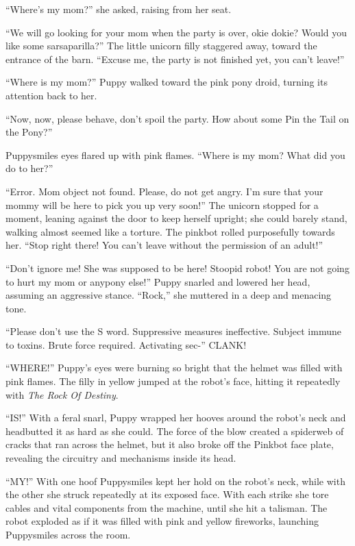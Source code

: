 ``Where's my mom?'' she asked, raising from her seat.

``We will go looking for your mom when the party is over, okie dokie? Would you like some sarsaparilla?'' The little unicorn filly staggered away, toward the entrance of the barn. ``Excuse me, the party is not finished yet, you can't leave!''

``Where is my mom?'' Puppy walked toward the pink pony droid, turning its attention back to her.

``Now, now, please behave, don't spoil the party. How about some Pin the Tail on the Pony?''

Puppysmiles eyes flared up with pink flames. ``Where is my mom? What did you do to her?''

``Error. Mom object not found. Please, do not get angry. I'm sure that your mommy will be here to pick you up very soon!'' The unicorn stopped for a moment, leaning against the door to keep herself upright; she could barely stand, walking almost seemed like a torture. The pinkbot rolled purposefully towards her. ``Stop right there! You can't leave without the permission of an adult!''

``Don't ignore me! She was supposed to be here! Stoopid robot! You are not going to hurt my mom or anypony else!'' Puppy snarled and lowered her head, assuming an aggressive stance. ``Rock,'' she muttered in a deep and menacing tone.

``Please don't use the S word. Suppressive measures ineffective. Subject immune to toxins. Brute force required. Activating sec-'' CLANK!

``WHERE!'' Puppy's eyes were burning so bright that the helmet was filled with pink flames. The filly in yellow jumped at the robot's face, hitting it repeatedly with \emph{The Rock Of Destiny}.

``IS!'' With a feral snarl, Puppy wrapped her hooves around the robot's neck and headbutted it as hard as she could. The force of the blow created a spiderweb of cracks that ran across the helmet, but it also broke off the Pinkbot face plate, revealing the circuitry and mechanisms inside its head.

``MY!'' With one hoof Puppysmiles kept her hold on the robot's neck, while with the other she struck repeatedly at its exposed face. With each strike she tore cables and vital components from the machine, until she hit a talisman. The robot exploded as if it was filled with pink and yellow fireworks, launching Puppysmiles across the room.

